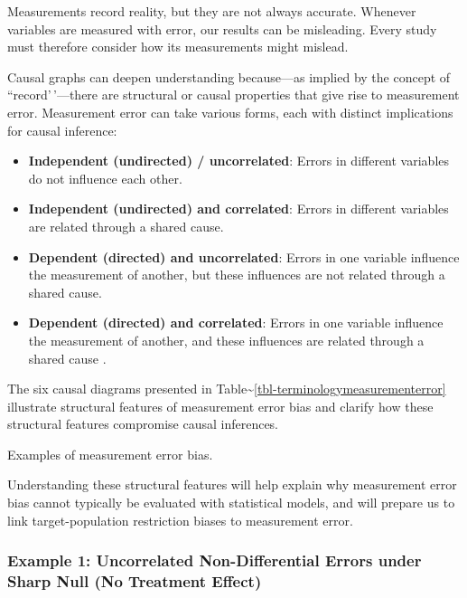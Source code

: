 \documentclass[
  ignorenonframetext,
  aspectratio=169,
]{beamer}
\begin{document}
\begin{frame}
Measurements record reality, but they are not always accurate. Whenever
variables are measured with error, our results can be misleading. Every
study must therefore consider how its measurements might mislead.

Causal graphs can deepen understanding because---as implied by the
concept of ``record'\,'---there are structural or causal properties that
give rise to measurement error. Measurement error can take various
forms, each with distinct implications for causal inference:

\begin{itemize}
    \item \textbf{Independent (undirected) / uncorrelated}: Errors in different variables do not influence each other.
    \item \textbf{Independent (undirected) and correlated}: Errors in different variables are related through a shared cause.
    \item \textbf{Dependent (directed) and uncorrelated}: Errors in one variable influence the measurement of another, but these influences are not related through a shared cause.
    \item \textbf{Dependent (directed) and correlated}: Errors in one variable influence the measurement of another, and these influences are related through a shared cause \citep{hernan2009, vanderweele2012a}.
\end{itemize}

The six causal diagrams presented in
Table\textasciitilde{}\ref{tbl-terminologymeasurementerror} illustrate
structural features of measurement error bias and clarify how these
structural features compromise causal inferences.

\begin{table}[ht]
\centering
\terminologymeasurementerror
\caption{Examples of measurement error bias.}
\label{tbl-terminologymeasurementerror}
\end{table}

Understanding these structural features will help explain why
measurement error bias cannot typically be evaluated with statistical
models, and will prepare us to link target-population restriction biases
to measurement error.

\subsubsection*{Example 1: Uncorrelated Non-Differential Errors under Sharp Null (No Treatment Effect)}


\end{frame}
\end{document}
